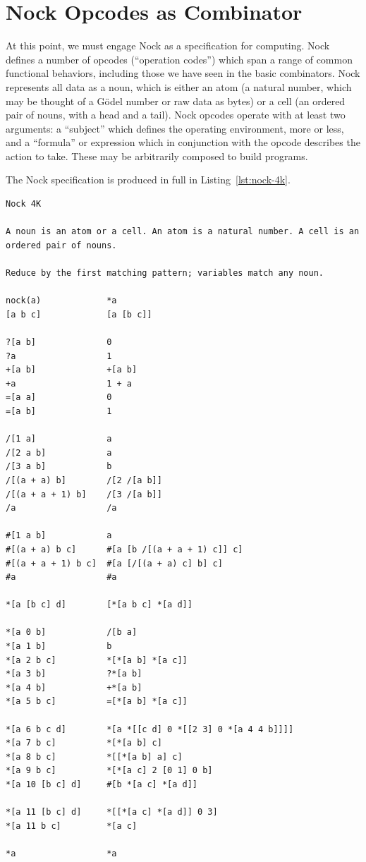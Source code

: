 \section{Nock Opcodes as Combinator}

At this point, we must engage Nock as a specification for computing.  Nock defines a number of opcodes (``operation codes'') which span a range of common functional behaviors, including those we have seen in the basic combinators.  Nock represents all data as a noun, which is either an atom (a natural number, which may be thought of a G\"{o}del number or raw data as bytes) or a cell (an ordered pair of nouns, with a head and a tail).  Nock opcodes operate with at least two arguments:  a ``subject'' which defines the operating environment, more or less, and a ``formula'' or expression which in conjunction with the opcode describes the action to take.  These may be arbitrarily composed to build programs.

The Nock specification is produced in full in Listing~\ref{lst:nock-4k}.

\begin{lstlisting}[style=listingblock,
                   caption={Nock 4K},
                   label={lst:nock-4k}]
Nock 4K

A noun is an atom or a cell. An atom is a natural number. A cell is an
ordered pair of nouns.

Reduce by the first matching pattern; variables match any noun.

nock(a)             *a
[a b c]             [a [b c]]

?[a b]              0
?a                  1
+[a b]              +[a b]
+a                  1 + a
=[a a]              0
=[a b]              1

/[1 a]              a
/[2 a b]            a
/[3 a b]            b
/[(a + a) b]        /[2 /[a b]]
/[(a + a + 1) b]    /[3 /[a b]]
/a                  /a

#[1 a b]            a
#[(a + a) b c]      #[a [b /[(a + a + 1) c]] c]
#[(a + a + 1) b c]  #[a [/[(a + a) c] b] c]
#a                  #a

*[a [b c] d]        [*[a b c] *[a d]]

*[a 0 b]            /[b a]
*[a 1 b]            b
*[a 2 b c]          *[*[a b] *[a c]]
*[a 3 b]            ?*[a b]
*[a 4 b]            +*[a b]
*[a 5 b c]          =[*[a b] *[a c]]

*[a 6 b c d]        *[a *[[c d] 0 *[[2 3] 0 *[a 4 4 b]]]]
*[a 7 b c]          *[*[a b] c]
*[a 8 b c]          *[[*[a b] a] c]
*[a 9 b c]          *[*[a c] 2 [0 1] 0 b]
*[a 10 [b c] d]     #[b *[a c] *[a d]]

*[a 11 [b c] d]     *[[*[a c] *[a d]] 0 3]
*[a 11 b c]         *[a c]

*a                  *a
\end{lstlisting}


